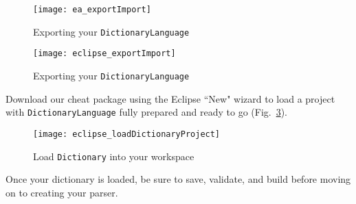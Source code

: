 \begin{description}
\begin{figure}[htbp]
\begin{center}
  \texttt{[image: ea\_exportImport]}
  \caption{Exporting your \texttt{DictionaryLanguage}}
  \label{ea_expImp}
\end{center}
\end{figure}

\begin{figure}[htbp]
\begin{center}
  \texttt{[image: eclipse\_exportImport]}
  \caption{Exporting your \texttt{DictionaryLanguage}}
  \label{eclipse_expImp}
\end{center}
\end{figure}

\newpage

\item[Option 3:] Download our cheat package using the Eclipse ``New" wizard to load a project with \texttt{DictionaryLanguage} fully prepared and ready to
go (Fig.~\ref{eclipse_cheatPackage}).

\vspace{0.5cm}

\begin{figure}[htbp]
\begin{center}
  \texttt{[image: eclipse\_loadDictionaryProject]}
  \caption{Load \texttt{Dictionary} into your workspace}
  \label{eclipse_cheatPackage}
\end{center}
\end{figure}

\end{description} 

Once your dictionary is loaded, be sure to save, validate, and build before moving on to creating your parser.





